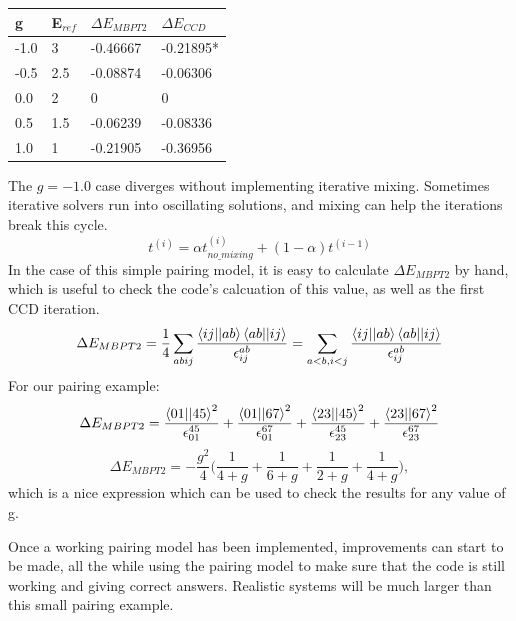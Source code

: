 \begin{center}
    \begin{tabular}{| l | l | l | l |}
    \hline
    g & E$_{ref}$ & $\Delta E_{MBPT2}$ & $\Delta E_{CCD}$ \\ \hline
    -1.0 & 3 & -0.46667 & -0.21895* \\ \hline
    -0.5 & 2.5 & -0.08874 & -0.06306 \\ \hline
    0.0 & 2 & 0 & 0 \\ \hline
    0.5 & 1.5 & -0.06239 & -0.08336 \\ \hline
    1.0 & 1 & -0.21905 & -0.36956 \\ \hline     
    \end{tabular}
\end{center}
The $g=-1.0$ case diverges without implementing iterative mixing. Sometimes iterative solvers run into oscillating solutions, and mixing can help the iterations break this cycle.
\begin{equation}
t^{(i)} = \alpha t^{(i)}_{no\_mixing} + (1 - \alpha) t^{(i-1)}
\end{equation}
In the case of this simple pairing model, it is easy to calculate $\Delta E_{MBPT2}$ by hand, which is useful to check the code's calcuation of this value, as well as the first CCD iteration.
\begin{equation}
\Delta E_{MBPT2} = \frac{1}{4} \sum_{abij} \frac{\braket{ij||ab} \braket{ab||ij}}{ \epsilon_{ij}^{ab}} = \sum_{a<b,i<j} \frac{\braket{ij||ab} \braket{ab||ij}}{ \epsilon_{ij}^{ab}}
\end{equation}
For our pairing example:
\[
\Delta E_{MBPT2} = \frac{\braket{01||45}^2}{\epsilon_{01}^{45}} + \frac{\braket{01||67}^2}{\epsilon_{01}^{67}} + \frac{\braket{23||45}^2}{\epsilon_{23}^{45}} + \frac{\braket{23||67}^2}{\epsilon_{23}^{67}} 
\]
\[
\Delta E_{MBPT2} = -\frac{g^2}{4} \bigg( \frac{1}{  4 + g} + \frac{1}{  6 + g} + \frac{1}{  2 + g} + \frac{1}{  4 + g}  \bigg),
\]
which is a nice expression which can be used to check the results for any value of g.

Once a working pairing model has been implemented, improvements can start to be made, all the while using the pairing model to make sure that the code is still working and giving correct answers. Realistic systems will be much larger than this small pairing example. 

